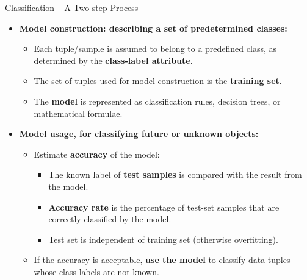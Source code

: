 \begin{frame}{Classification -- A Two-step Process}
	\begin{itemize}
		\item \textbf{Model construction: describing a set of predetermined classes:}
		      \begin{itemize}
			      \item Each tuple/sample is assumed to belong to a predefined class, as determined by the \textbf{\color{airforceblue}class-label attribute}.
			      \item The set of tuples used for model construction is the \textbf{\color{airforceblue}training set}.
			      \item The \textbf{\color{airforceblue}model} is represented as classification rules, decision trees, or mathematical formulae.
		      \end{itemize}
		\item \textbf{Model usage, for classifying future or unknown objects:}
		      \begin{itemize}
			      \item Estimate \textbf{\color{airforceblue}accuracy} of the model:
			            \begin{itemize}
				            \item The known label of \textbf{test samples} is compared with the result from the model.
				            \item \textbf{Accuracy rate} is the percentage of test-set samples that are correctly classified by the model.
				            \item Test set is independent of training set (otherwise overfitting).
			            \end{itemize}
			      \item If the accuracy is acceptable, \textbf{\color{airforceblue}use the model} to classify data tuples whose class labels are not known.
		      \end{itemize}
	\end{itemize}
\end{frame}

